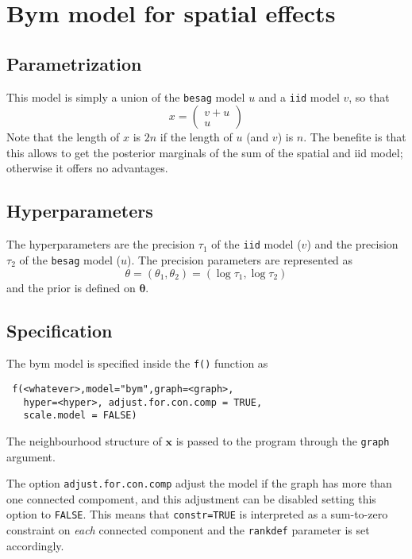 \documentclass[a4paper,11pt]{article}
\begin{document}
\section*{Bym model for spatial effects}

\subsection*{Parametrization}

This model is simply a union of the  \lstinline$besag$ model $u$ and a
\lstinline$iid$ model $v$, so that
\begin{displaymath}
    x =
    \begin{pmatrix}
        v + u\\
        u
    \end{pmatrix}
\end{displaymath}
Note that the length of $x$ is $2n$ if the length of $u$ (and $v$) is
$n$. The benefite is that this allows to get the posterior marginals
of the sum of the spatial and iid model; otherwise it offers no
advantages.

\subsection*{Hyperparameters}
The hyperparameters are the precision $\tau_1$ of the \lstinline$iid$
model ($v$) and the precision $\tau_2$ of the \lstinline$besag$ model
($u$).  The precision parameters are represented as
\begin{displaymath}
    \theta=(\theta_1,\theta_2) =(\log \tau_1,\log \tau_2)
\end{displaymath}
and the prior is defined on $\mathbf{\theta}$.

\subsection*{Specification}

The bym model is specified inside the {\tt f()} function as
\begin{verbatim}
 f(<whatever>,model="bym",graph=<graph>,
   hyper=<hyper>, adjust.for.con.comp = TRUE,
   scale.model = FALSE)
\end{verbatim}

The neighbourhood structure of $\mathbf{x}$ is passed to the program
through the {\tt graph} argument.

The option \verb|adjust.for.con.comp| adjust the model if the graph
has more than one connected compoment, and this adjustment can be
disabled setting this option to \texttt{FALSE}. This means that
\texttt{constr=TRUE} is interpreted as a sum-to-zero constraint on
\emph{each} connected component and the \texttt{rankdef} parameter is
set accordingly. 
\end{document}
